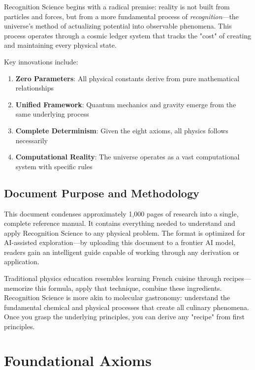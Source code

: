 \documentclass[12pt,a4paper]{article}
\theoremstyle{definition}
\begin{document}
Recognition Science begins with a radical premise: reality is not built from particles and forces, but from a more fundamental process of \textit{recognition}—the universe's method of actualizing potential into observable phenomena. This process operates through a cosmic ledger system that tracks the "cost" of creating and maintaining every physical state.

Key innovations include:

\begin{enumerate}
    \item \textbf{Zero Parameters}: All physical constants derive from pure mathematical relationships
    \item \textbf{Unified Framework}: Quantum mechanics and gravity emerge from the same underlying process
    \item \textbf{Complete Determinism}: Given the eight axioms, all physics follows necessarily
    \item \textbf{Computational Reality}: The universe operates as a vast computational system with specific rules
\end{enumerate}

\subsection{Document Purpose and Methodology}

This document condenses approximately 1,000 pages of research into a single, complete reference manual. It contains everything needed to understand and apply Recognition Science to any physical problem. The format is optimized for AI-assisted exploration—by uploading this document to a frontier AI model, readers gain an intelligent guide capable of working through any derivation or application.

\begin{tcolorbox}[colback=yellow!10,colframe=orange!50,title=Methodological Note]
Traditional physics education resembles learning French cuisine through recipes—memorize this formula, apply that technique, combine these ingredients. Recognition Science is more akin to molecular gastronomy: understand the fundamental chemical and physical processes that create all culinary phenomena. Once you grasp the underlying principles, you can derive any "recipe" from first principles.
\end{tcolorbox}

\section{Foundational Axioms}
\end{document}
